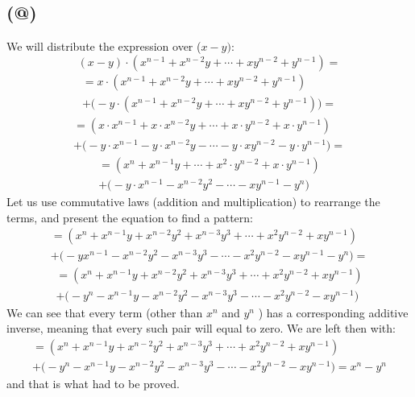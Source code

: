 \documentclass{article}
\makeatletter
\newcommand*{\rom}[1]{\expandafter\@slowromancap\romannumeral #1@}
\makeatother
\begin{document}
\subsection*{(\rom{5})}
We will distribute the expression over (\(x-y)\):
\begin{equation*}
	(x-y) \cdot (x^{n-1} + x^{n-2}y + \cdots + xy^{n-2} + y^{n-1}) = 
\end{equation*}
\begin{multline*}
	= x \cdot (x^{n-1} + x^{n-2}y + \cdots + xy^{n-2} + y^{n-1})\\
	+ \Big(-y \cdot (x^{n-1} + x^{n-2}y + \cdots + xy^{n-2} + y^{n-1}) \Big) = 
\end{multline*}
\begin{multline*}
	= (x \cdot x^{n-1} + x \cdot x^{n-2}y + \cdots + x \cdot y^{n-2} + x \cdot y^{n-1})\\
	+ \Big(-y \cdot x^{n-1} -y \cdot x^{n-2}y - \cdots -y \cdot xy^{n-2} -y \cdot y^{n-1}\Big) = 
\end{multline*}
\begin{multline*}
	= (x^{n} + x^{n-1}y + \cdots + x^{2} \cdot y^{n-2} + x \cdot y^{n-1})\\
	+ \Big(-y \cdot x^{n-1} - x^{n-2}y^{2} - \cdots - xy^{n-1} - y^{n}\Big)
\end{multline*}
Let us use commutative laws (addition and multiplication) to rearrange the terms, and present the equation to find a pattern:
\begin{multline*}
	= (x^{n} + x^{n-1}y + x^{n-2}y^2 + x^{n-3}y^3 + \cdots + x^{2}  y^{n-2} + x  y^{n-1})\\
	+ \Big(-y  x^{n-1} - x^{n-2}y^{2} - x^{n-3}y^{3} - \cdots - x^{2}y^{n-2} - xy^{n-1} - y^{n}\Big) = 
\end{multline*}
\begin{multline*}
	= (x^{n} + x^{n-1}y + x^{n-2}y^2 + x^{n-3}y^3 + \cdots + x^{2}  y^{n-2} + x  y^{n-1})\\
	+ \Big(-y^{n} - x^{n-1}y - x^{n-2}y^{2} - x^{n-3}y^{3} - \cdots - x^{2}y^{n-2} - xy^{n-1}\Big) 
\end{multline*}
We can see that every term (other than \(x^{n}\) and \(y^{n}\) ) has a corresponding additive inverse, meaning that every such pair
will equal to zero. We are left then with:
\begin{multline*}
	= (x^{n} + x^{n-1}y + x^{n-2}y^2 + x^{n-3}y^3 + \cdots + x^{2}  y^{n-2} + x  y^{n-1})\\
	+ \Big(-y^{n} - x^{n-1}y - x^{n-2}y^{2} - x^{n-3}y^{3} - \cdots - x^{2}y^{n-2} - xy^{n-1}\Big) = x^{n} - y^{n}
\end{multline*}
and that is what had to be proved.
\end{document}
